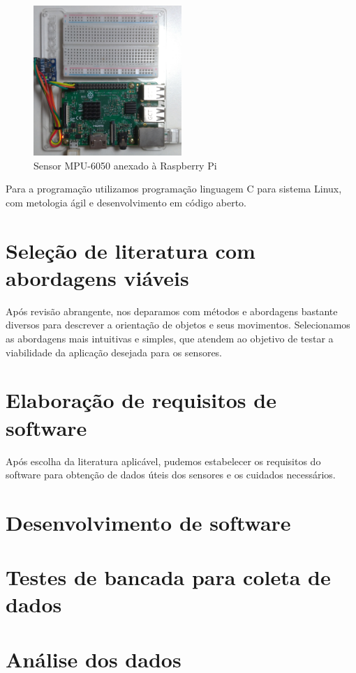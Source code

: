 \begin{figure}[H]
    \centering
    \caption{Sensor MPU-6050 anexado à Raspberry Pi}\label{fig:mpu6050-proto-top}
    \includegraphics[width=0.5\textwidth]{figuras/mpu6050-proto-top.jpg}
\end{figure}

Para a programação utilizamos programação linguagem C para sistema Linux, com metologia ágil e desenvolvimento em código aberto.

\section{Seleção de literatura com abordagens viáveis}

Após revisão abrangente, nos deparamos com métodos e abordagens bastante diversos para descrever a orientação de objetos e seus movimentos. Selecionamos as abordagens mais intuitivas e simples, que atendem ao objetivo de testar a viabilidade da aplicação desejada para os sensores.

\section{Elaboração de requisitos de software}

Após escolha da literatura aplicável, pudemos estabelecer os requisitos do software para obtenção de dados úteis dos sensores e os cuidados necessários.

\section{Desenvolvimento de software}

\section{ Testes de bancada para coleta de dados}

\section{ Análise dos dados}

